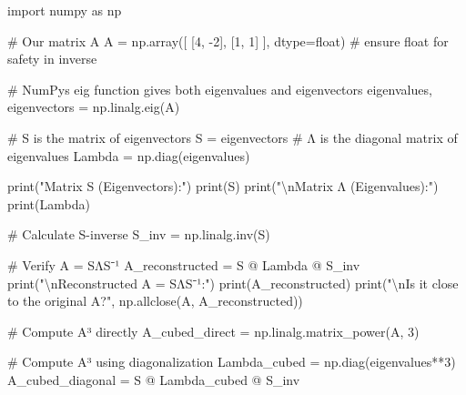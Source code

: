 \documentclass[
  letterpaper,
  DIV=11,
  numbers=noendperiod]{scrreprt}
\newenvironment{Shaded}{\begin{snugshade}}{\end{snugshade}}
\newcommand{\BuiltInTok}[1]{\textcolor[rgb]{0.00,0.23,0.31}{#1}}
\newcommand{\CharTok}[1]{\textcolor[rgb]{0.13,0.47,0.30}{#1}}
\newcommand{\CommentTok}[1]{\textcolor[rgb]{0.37,0.37,0.37}{#1}}
\newcommand{\DecValTok}[1]{\textcolor[rgb]{0.68,0.00,0.00}{#1}}
\newcommand{\ImportTok}[1]{\textcolor[rgb]{0.00,0.46,0.62}{#1}}
\newcommand{\NormalTok}[1]{\textcolor[rgb]{0.00,0.23,0.31}{#1}}
\newcommand{\OperatorTok}[1]{\textcolor[rgb]{0.37,0.37,0.37}{#1}}
\newcommand{\StringTok}[1]{\textcolor[rgb]{0.13,0.47,0.30}{#1}}
\begin{document}
\label{verify-diagonalization}
\begin{Shaded}
\begin{Highlighting}[]
\ImportTok{import}\NormalTok{ numpy }\ImportTok{as}\NormalTok{ np}

\CommentTok{\# Our matrix A}
\NormalTok{A }\OperatorTok{=}\NormalTok{ np.array([}
\NormalTok{    [}\DecValTok{4}\NormalTok{, }\OperatorTok{{-}}\DecValTok{2}\NormalTok{],}
\NormalTok{    [}\DecValTok{1}\NormalTok{,  }\DecValTok{1}\NormalTok{]}
\NormalTok{], dtype}\OperatorTok{=}\BuiltInTok{float}\NormalTok{)  }\CommentTok{\# ensure float for safety in inverse}

\CommentTok{\# NumPy\textquotesingle{}s eig function gives both eigenvalues and eigenvectors}
\NormalTok{eigenvalues, eigenvectors }\OperatorTok{=}\NormalTok{ np.linalg.eig(A)}

\CommentTok{\# S is the matrix of eigenvectors}
\NormalTok{S }\OperatorTok{=}\NormalTok{ eigenvectors}
\CommentTok{\# Λ is the diagonal matrix of eigenvalues}
\NormalTok{Lambda }\OperatorTok{=}\NormalTok{ np.diag(eigenvalues)}

\BuiltInTok{print}\NormalTok{(}\StringTok{"Matrix S (Eigenvectors):"}\NormalTok{)}
\BuiltInTok{print}\NormalTok{(S)}
\BuiltInTok{print}\NormalTok{(}\StringTok{"}\CharTok{\textbackslash{}n}\StringTok{Matrix Λ (Eigenvalues):"}\NormalTok{)}
\BuiltInTok{print}\NormalTok{(Lambda)}

\CommentTok{\# Calculate S{-}inverse}
\NormalTok{S\_inv }\OperatorTok{=}\NormalTok{ np.linalg.inv(S)}

\CommentTok{\# Verify A = SΛS⁻¹}
\NormalTok{A\_reconstructed }\OperatorTok{=}\NormalTok{ S }\OperatorTok{@}\NormalTok{ Lambda }\OperatorTok{@}\NormalTok{ S\_inv}
\BuiltInTok{print}\NormalTok{(}\StringTok{"}\CharTok{\textbackslash{}n}\StringTok{Reconstructed A = SΛS⁻¹:"}\NormalTok{)}
\BuiltInTok{print}\NormalTok{(A\_reconstructed)}
\BuiltInTok{print}\NormalTok{(}\StringTok{"}\CharTok{\textbackslash{}n}\StringTok{Is it close to the original A?"}\NormalTok{, np.allclose(A, A\_reconstructed))}

\CommentTok{\# Compute A³ directly}
\NormalTok{A\_cubed\_direct }\OperatorTok{=}\NormalTok{ np.linalg.matrix\_power(A, }\DecValTok{3}\NormalTok{)}

\CommentTok{\# Compute A³ using diagonalization}
\NormalTok{Lambda\_cubed }\OperatorTok{=}\NormalTok{ np.diag(eigenvalues}\OperatorTok{**}\DecValTok{3}\NormalTok{)}
\NormalTok{A\_cubed\_diagonal }\OperatorTok{=}\NormalTok{ S }\OperatorTok{@}\NormalTok{ Lambda\_cubed }\OperatorTok{@}\NormalTok{ S\_inv}


\end{Highlighting}
\end{Shaded}
\end{document}
